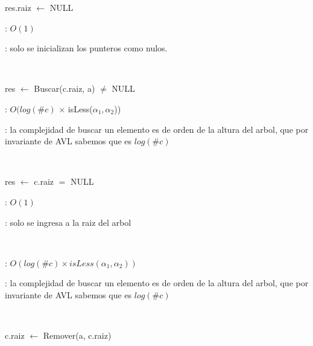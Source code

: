 \begin{Algoritmos}

	\begin{algorithm}[H]
		\NoCaptionOfAlgo
		\caption{}
		res.raiz $\leftarrow$ NULL
	\end{algorithm}

	\complejidad: $O(1)$

	\justifcomp: solo se inicializan los punteros como nulos.

	~

	\begin{algorithm}[H]
		\NoCaptionOfAlgo
		\caption{}
		res $\leftarrow$ Buscar(c.raiz, a) $\neq$ NULL
	\end{algorithm}

	\complejidad: $ O(log(\#c)$ $\times$ isLess($ \alpha_1, \alpha_2 $))

	\justifcomp: la complejidad de buscar un elemento es de orden de la altura del arbol, que por invariante de AVL sabemos que es $log(\#c)$

	~

	\begin{algorithm}[H]
		\NoCaptionOfAlgo
		\caption{}
		res $\leftarrow$ c.raiz $=$ NULL
	\end{algorithm}

	\complejidad: $O(1)$

	\justifcomp: solo se ingresa a la raiz del arbol

	~

	\begin{algorithm}[H]
		\NoCaptionOfAlgo
		\caption{}
	\end{algorithm}

	\complejidad: $O(log(\#c) \times isLess(\alpha_1, \alpha_2))$

	\justifcomp: la complejidad de buscar un elemento es de orden de la altura del arbol, que por invariante de AVL sabemos que es $log(\#c)$

	~

	\begin{algorithm}[H]
		\NoCaptionOfAlgo
		\caption{}
		c.raiz $\leftarrow$ Remover(a, c.raiz)
	\end{algorithm}


\end{Algoritmos}
